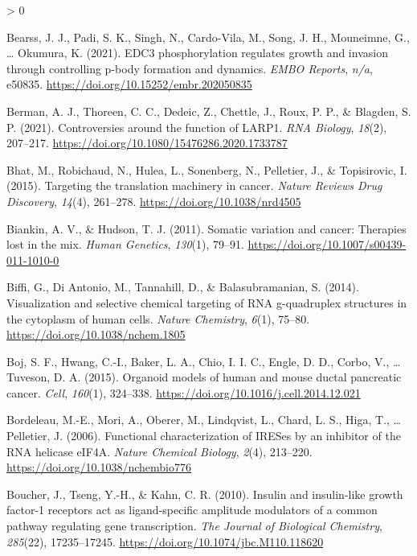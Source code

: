 \documentclass[
  12pt,
  openany]{book}
\newlength{\cslhangindent}
\newenvironment{CSLReferences}[2] %
 {%
  \setlength{\parindent}{0pt}
  \ifodd #1 \everypar{\setlength{\hangindent}{\cslhangindent}}\ignorespaces\fi
  \ifnum #2 > 0
  \setlength{\parskip}{#2\baselineskip}
  \fi
 }%
 {}
\begin{document}
\begin{CSLReferences}{1}{0}
\leavevmode\hypertarget{ref-Bearss2021}{}%
Bearss, J. J., Padi, S. K., Singh, N., Cardo-Vila, M., Song, J. H., Mouneimne, G., \ldots{} Okumura, K. (2021). {EDC}3 phosphorylation regulates growth and invasion through controlling p-body formation and dynamics. \emph{{EMBO} Reports}, \emph{n/a}, e50835. \url{https://doi.org/10.15252/embr.202050835}

\leavevmode\hypertarget{ref-Berman2021}{}%
Berman, A. J., Thoreen, C. C., Dedeic, Z., Chettle, J., Roux, P. P., \& Blagden, S. P. (2021). Controversies around the function of {LARP}1. \emph{{RNA} Biology}, \emph{18}(2), 207--217. \url{https://doi.org/10.1080/15476286.2020.1733787}

\leavevmode\hypertarget{ref-Bhat2015}{}%
Bhat, M., Robichaud, N., Hulea, L., Sonenberg, N., Pelletier, J., \& Topisirovic, I. (2015). Targeting the translation machinery in cancer. \emph{Nature Reviews Drug Discovery}, \emph{14}(4), 261--278. \url{https://doi.org/10.1038/nrd4505}

\leavevmode\hypertarget{ref-Biankin2011}{}%
Biankin, A. V., \& Hudson, T. J. (2011). Somatic variation and cancer: Therapies lost in the mix. \emph{Human Genetics}, \emph{130}(1), 79--91. \url{https://doi.org/10.1007/s00439-011-1010-0}

\leavevmode\hypertarget{ref-Biffi2014}{}%
Biffi, G., Di Antonio, M., Tannahill, D., \& Balasubramanian, S. (2014). Visualization and selective chemical targeting of {RNA} g-quadruplex structures in the cytoplasm of human cells. \emph{Nature Chemistry}, \emph{6}(1), 75--80. \url{https://doi.org/10.1038/nchem.1805}

\leavevmode\hypertarget{ref-Boj2015}{}%
Boj, S. F., Hwang, C.-I., Baker, L. A., Chio, I. I. C., Engle, D. D., Corbo, V., \ldots{} Tuveson, D. A. (2015). Organoid models of human and mouse ductal pancreatic cancer. \emph{Cell}, \emph{160}(1), 324--338. \url{https://doi.org/10.1016/j.cell.2014.12.021}

\leavevmode\hypertarget{ref-Bordeleau2006}{}%
Bordeleau, M.-E., Mori, A., Oberer, M., Lindqvist, L., Chard, L. S., Higa, T., \ldots{} Pelletier, J. (2006). Functional characterization of {IRESes} by an inhibitor of the {RNA} helicase {eIF}4A. \emph{Nature Chemical Biology}, \emph{2}(4), 213--220. \url{https://doi.org/10.1038/nchembio776}

\leavevmode\hypertarget{ref-Boucher2010}{}%
Boucher, J., Tseng, Y.-H., \& Kahn, C. R. (2010). Insulin and insulin-like growth factor-1 receptors act as ligand-specific amplitude modulators of a common pathway regulating gene transcription. \emph{The Journal of Biological Chemistry}, \emph{285}(22), 17235--17245. \url{https://doi.org/10.1074/jbc.M110.118620}


\end{CSLReferences}
\end{document}

